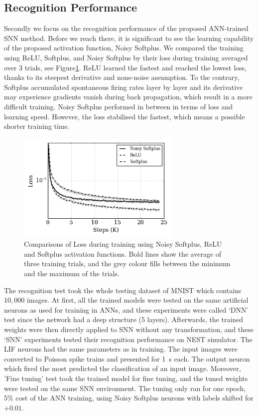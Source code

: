 	\subsection{Recognition Performance}
	\label{subsec:result_compare}
	Secondly we focus on the recognition performance of the proposed ANN-trained SNN method.
	Before we reach there, it is significant to see the learning capability of the proposed activation function, Noisy Softplus.
	We compared the training using ReLU, Softplus, and Noisy Softplus by their loss during training averaged over 3 trials, see Figure\ref{Fig:loss_ns}.
	ReLU learned the fastest and reached the lowest loss, thanks to its steepest derivative and none-noise assumption.
	To the contrary, Softplus accumulated spontaneous firing rates layer by layer and its derivative may experience gradients vanish during back propagation, which result in a more difficult training.
	Noisy Softplus performed in between in terms of loss and learning speed.
	However, the loss stabilised the fastest, which means a possible shorter training time.
	\begin{figure}[tbp!]
		\centering
		\includegraphics[width=0.7\textwidth]{pics_iconip/8.png}
		\caption{Comparisons of Loss during training using Noisy Softplus, ReLU and Softplus activation functions. Bold lines show the average of three training trials, and the grey colour fills between the minimum and the maximum of the trials.  }
		\label{Fig:loss_ns}
	\end{figure}
	
	The recognition test took the whole testing dataset of MNIST which contains $10,000$ images.
	At first, all the trained models were tested on the same artificial neurons as used for training in ANNs, and these experiments were called `DNN' test since the network had a deep structure (5 layers).
	Afterwards, the trained weights were then directly applied to SNN without any transformation, and these `SNN' experiments tested their recognition performance on NEST simulator.
	The LIF neurons had the same parameters as in training.
	The input images were converted to Poisson spike trains and presented for 1~s each.
	The output neuron which fired the most predicted the classification of an input image.
	Moreover, 'Fine tuning' test took the trained model for fine tuning, and the tuned weights were tested on the same SNN environment.
	The tuning only ran for one epoch, 5\% cost of the ANN training, using Noisy Softplus neurons with labels shifted for $+0.01$.
	
